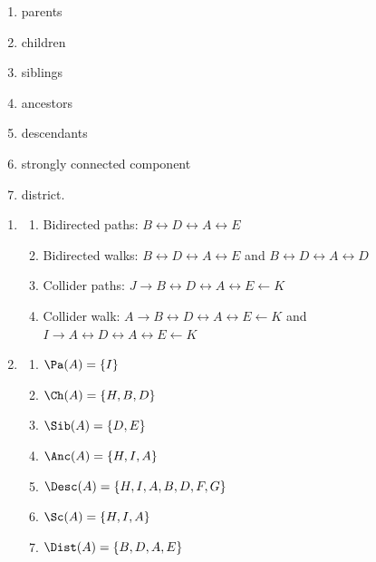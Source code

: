 \begin{enumerate}[label=5.\arabic*]
\begin{enumerate}
        \begin{enumerate}
            \item parents
            \item children
            \item siblings
            \item ancestors
            \item descendants
            \item strongly connected component
            \item district.
        \end{enumerate}
    \end{enumerate}

    \begin{ungradedsolution}
        \begin{enumerate}
            \item
            \begin{enumerate}
                \item Bidirected paths: $B\leftrightarrow D \leftrightarrow A \leftrightarrow E$
                \item Bidirected walks: $B\leftrightarrow D \leftrightarrow A \leftrightarrow E$ and $B\leftrightarrow D \leftrightarrow A \leftrightarrow D$
                \item Collider paths: $J \rightarrow B \leftrightarrow D \leftrightarrow A \leftrightarrow E \leftarrow K$
                \item Collider walk: $A \rightarrow B\leftrightarrow D \leftrightarrow A \leftrightarrow E \leftarrow K$ and $I \rightarrow A \leftrightarrow D \leftrightarrow A \leftrightarrow E \leftarrow K$
            \end{enumerate}
            \item
            \begin{enumerate}
                \item $\Pa(A) = \{I\}$
                \item $\Ch(A) = \{H, B, D\}$
                \item $\Sib(A) = \{D, E\}$
                \item $\Anc(A) = \{H, I, A\}$
                \item $\Desc(A) = \{H, I, A, B, D, F, G\}$
                \item $\Sc(A) = \{H, I, A\}$
                \item $\Dist(A) = \{B, D, A, E\}$
            \end{enumerate}
        \end{enumerate}
    \end{ungradedsolution}


\end{enumerate}
